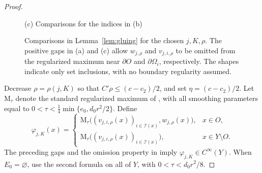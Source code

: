 \documentclass[reqno]{amsart}
\theoremstyle{remark}
\theoremstyle{plain}
\begin{document}
\begin{proof}
\begin{figure}[!htbp]
\medskip
{\footnotesize\textup{(c) Comparisons for the indices in (b)}}\par\smallskip
{}
\caption{Comparisons in Lemma~\ref{lem:gluing} for the chosen \(j,K,\rho\).
The positive gaps in (a) and (c) allow \(w_{j,\rho}\) and
\(v_{j,i,\rho}\) to be omitted from the regularized maximum near
\(\partial O\) and \(\partial\Omega_i\), respectively.
The shapes indicate only set inclusions, with no boundary regularity assumed.}
\label{fig:gluing-comparisons}
\end{figure}

Decrease \(\rho=\rho(j,K)\) so that \(C'\rho\le(c-c_2)/2\), and set \(\eta=(c-c_2)/2\). Let \(\mathrm M_\tau\) denote the standard regularized maximum of \cite[I, Lemma 5.18]{Demailly}, with all smoothing parameters equal to
\(0<\tau<\frac14\min\{e_0,d_0r^2/2\}\). Define
\[
\varphi_{j,K}(x)=
\begin{cases}
\mathrm M_\tau\bigl((v_{j,i,\rho}(x))_{i\in\mathcal I(x)},
 w_{j,\rho}(x)\bigr),&x\in O,\\[2pt]
\mathrm M_\tau\bigl((v_{j,i,\rho}(x))_{i\in\mathcal I(x)}\bigr),
 &x\in Y\setminus O.
\end{cases}
\]
The preceding gaps and the omission property in \cite[I, Lemma 5.18(c)]{Demailly} imply \(\varphi_{j,K}\in C^\infty(Y)\). When \(E_0=\varnothing\), use the second formula on all of \(Y\), with \(0<\tau<d_0r^2/8\).


\end{proof}
\end{document}
